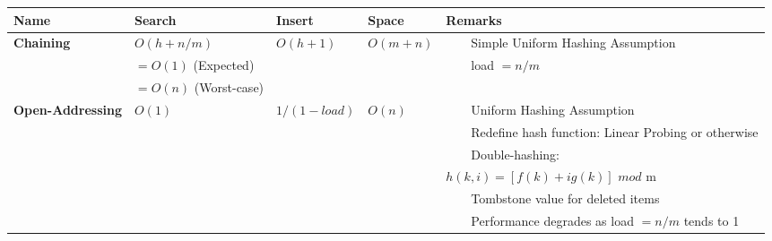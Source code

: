 \documentclass{article}
\newcommand{\tabitem}{~~\llap{\textbullet}~~}
\begin{document}
    \noindent\begin{tabular}{|l|l|l|l|p{6.5cm}|}
        \toprule
        \textbf{Name} & \textbf{Search} & \textbf{Insert} & \textbf{Space} & \textbf{Remarks}\\
        \midrule
        \midrule
        \textbf{Chaining} & $O(h + n/m)$ & $O(h + 1)$ & $O(m+n)$ & \tabitem Simple Uniform Hashing Assumption\\
        & $= O(1)$ (Expected) &&&\tabitem load $= n/m$ \\
        & $= O(n)$ (Worst-case) &&&\\
        \midrule
        \textbf{Open-Addressing} &$O(1)$&$1/(1-load)$& $O(n)$ &\tabitem Uniform Hashing Assumption\\
        &&&&\tabitem Redefine hash function: Linear Probing or otherwise\\
        &&&&\tabitem Double-hashing:\\
        &&&& $h(k, i) = [f(k) + ig(k)]$ $mod$ m\\
        &&&&\tabitem Tombstone value for deleted items\\
        &&&&\tabitem Performance degrades as load $= n/m$ tends to 1\\
        \bottomrule
    \end{tabular}


    

    
\end{document}
